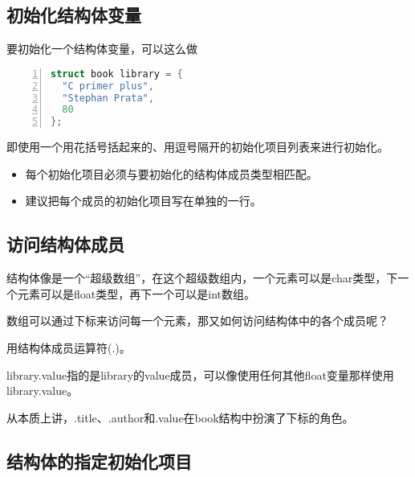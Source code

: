 \subsection{初始化结构体变量}

\begin{frame}[fragile]
要初始化一个结构体变量，可以这么做
\begin{lstlisting}[language=c,numbers=left,frame=single]
struct book library = {
  "C primer plus",
  "Stephan Prata",
  80
};  
\end{lstlisting}
即使用一个用花括号括起来的、用逗号隔开的初始化项目列表来进行初始化。
\begin{itemize}
\item 每个初始化项目必须与要初始化的结构体成员类型相匹配。
\item 建议把每个成员的初始化项目写在单独的一行。
\end{itemize}
\end{frame}

\subsection{访问结构体成员}

\begin{frame}[fragile]
  结构体像是一个“超级数组”，在这个超级数组内，一个元素可以是{\tf char}类型，下一个元素可以是{\tf float}类型，再下一个可以是{\tf int}数组。\vspace{0.1in}

  数组可以通过下标来访问每一个元素，那又如何访问结构体中的各个成员呢？ \pause \vspace{0.1in}

  \textcolor{acolor1}{\Large 用结构体成员运算符{\tf (.)}。}\vspace{0.1in}

  {\tf library.value}指的是{\tf library}的value成员，可以像使用任何其他{\tf float}变量那样使用{\tf library.value}。\vspace{0.1in}

  \textcolor{acolor1}{从本质上讲，{\tf .title}、{\tf .author}和{\tf .value}在{\tf book}结构中扮演了下标的角色。}
\end{frame}

\subsection{结构体的指定初始化项目}


